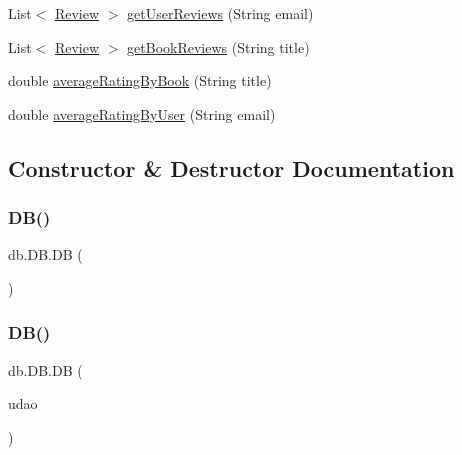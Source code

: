 \begin{DoxyCompactItemize}
\item 
List$<$ \hyperlink{classserver_1_1data_1_1_review}{Review} $>$ \hyperlink{classdb_1_1_d_b_a9ef4c302b91da17852f09a27a90fb4b5}{get\+User\+Reviews} (String email)
\item 
List$<$ \hyperlink{classserver_1_1data_1_1_review}{Review} $>$ \hyperlink{classdb_1_1_d_b_a02a42ee97d8e7189733dfc720a05452e}{get\+Book\+Reviews} (String title)
\item 
double \hyperlink{classdb_1_1_d_b_a8b2b9d6c4aabb17719e2d2af4cf7ba74}{average\+Rating\+By\+Book} (String title)
\item 
double \hyperlink{classdb_1_1_d_b_a38091677ae1e964a84320d6e539ea62e}{average\+Rating\+By\+User} (String email)
\end{DoxyCompactItemize}


\subsection{Constructor \& Destructor Documentation}
\mbox{\label{classdb_1_1_d_b_a1f91d243772e38f908a993724eb01243}} 
\subsubsection{\texorpdfstring{D\+B()}{DB()}\hspace{0.1cm}{\footnotesize\ttfamily [1/2]}}
{\footnotesize\ttfamily db.\+D\+B.\+DB (\begin{DoxyParamCaption}{ }\end{DoxyParamCaption})}

\mbox{\label{classdb_1_1_d_b_afdc419eebbdef14244d859ac59d19dc7}} 
\subsubsection{\texorpdfstring{D\+B()}{DB()}\hspace{0.1cm}{\footnotesize\ttfamily [2/2]}}
{\footnotesize\ttfamily db.\+D\+B.\+DB (\begin{DoxyParamCaption}\item[{\hyperlink{interfacedb_1_1_i_d_a_o}{I\+D\+AO}}]{udao }\end{DoxyParamCaption})}



